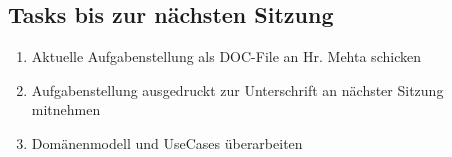 \documentclass[class=scrbook,crop=false]{standalone}
\begin{document}
    \subsection*{Tasks bis zur nächsten Sitzung}
    
    \begin{enumerate}
        \item Aktuelle Aufgabenstellung als DOC-File an Hr. Mehta schicken
        \item Aufgabenstellung ausgedruckt zur Unterschrift an nächster Sitzung mitnehmen
        \item Domänenmodell und UseCases überarbeiten
    \end{enumerate}
\end{document}

